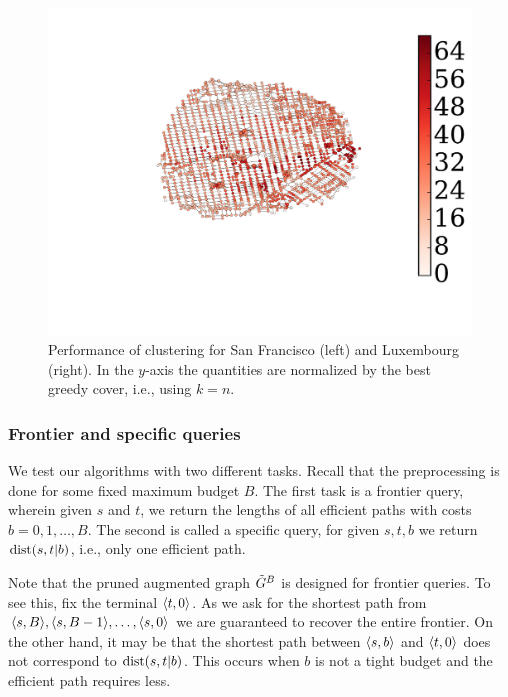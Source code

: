 \begin{figure}

\includegraphics[clip, trim=14cm 3cm 3cm 3cm,scale=0.1]{TexImg/SF_hub_sizes.pdf}

\caption{Performance of clustering for San Francisco (left) and Luxembourg (right). In the $y$-axis the quantities are normalized by the best greedy cover, i.e., using $k=n$.}
\label{fig:clusters}
\end{figure}

\subsubsection{Frontier and specific queries}

We test our algorithms with two different tasks.
Recall that the preprocessing is done for some fixed maximum budget $B$.
The first task is a frontier query, wherein given $s$ and $t$, we return the lengths of all efficient paths with costs $b=0,1,\ldots,B$.
The second is called a specific query, for given $s,t,b$ we return $\text{dist}(s,t|b)$, i.e., only one efficient path.

Note that the pruned augmented graph $\tilde G^B$ is designed for frontier queries.
To see this, fix the terminal $\langle t,0\rangle$.
As we ask for the shortest path from $\langle s,B\rangle,\langle s,B-1\rangle,\ldots,\langle s,0\rangle$ we are guaranteed to recover the entire frontier.
On the other hand, it may be that the shortest path between $\langle s,b\rangle$ and $\langle t,0\rangle$ does not correspond to $\text{dist}(s,t|b)$.
This occurs when $b$ is not a tight budget and the efficient path requires less.

